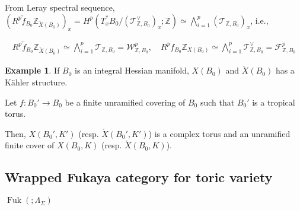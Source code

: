 \documentclass[a4paper,dvipdfmx,reqno,12pt]{amsart}
\theoremstyle{definition}
\newtheorem{Eg}[Thm]{Example}
\newcommand{\Z}{\mathbb{Z}}%
\newcommand{\mcal}[1]{\mathcal{#1}}%
\newcommand{\opn}[1]{\operatorname{#1}}
\newcommand{\TBZ}{\mcal{T}_{\Z,B_0}}
\numberwithin{equation}{section}
\begin{document}
From Leray spectral sequence, $(R^{p}\check{f}_{B_0}\Z_{\check{X}(B_0)})_{x}=H^{p}(T^{*}_xB_0/(\TBZ^{\vee})_x;\Z)\simeq \bigwedge_{i=1}^{p}(\TBZ)_{x}$, i.e.,

\begin{align}
  R^{p}\check{f}_{B_0}\Z_{\check{X}(B_0)}\simeq \bigwedge_{i=1}^{p} \TBZ=\mcal{W}^{p}_{\Z,B_0}, \quad R^{p}f_{B_0}\Z_{X(B_0)}\simeq \bigwedge_{i=1}^{p} \TBZ^{\vee}=\mcal{F}_{\Z,B_0}^{p}
\end{align}

\begin{Eg}
If $B_0$ is an integral Hessian manifold, 
$X(B_0)$ and $\check{X}(B_0)$ has a K\"ahler structure.

Let $f:B_0' \to B_0$ be a finite unramified covering of $B_0$ such that $B_0'$ is a tropical torus.

Then, $X(B_0',K')$ (resp. $\check{X}(B_0',K')$) 
is a complex torus and an unramified finite cover 
of $X(B_0,K)$ (resp. $\check{X}(B_0,K)$).

\end{Eg}

\subsection{Wrapped Fukaya category for toric variety}
$\opn{Fuk}(;\Lambda_{\Sigma})$
\cite[Theorem 3.4]{MR2871160}




\printindex
\end{document}
